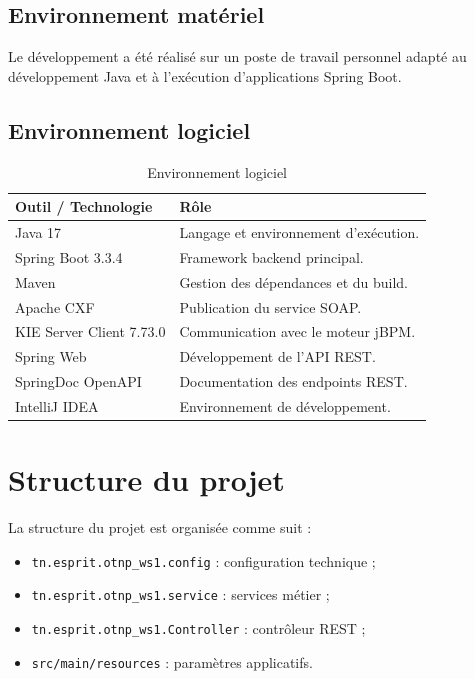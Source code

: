 \documentclass[12pt,a4paper]{report}
\begin{document}
\subsection{Environnement matériel}
Le développement a été réalisé sur un poste de travail personnel adapté au développement Java et à l'exécution d'applications Spring Boot.

\subsection{Environnement logiciel}
\begin{table}[h]
    \centering
    \begin{tabular}{p{4cm}p{9cm}}
        \toprule
        \textbf{Outil / Technologie} & \textbf{Rôle} \\
        \midrule
        Java 17 & Langage et environnement d'exécution. \\
        Spring Boot 3.3.4 & Framework backend principal. \\
        Maven & Gestion des dépendances et du build. \\
        Apache CXF & Publication du service SOAP. \\
        KIE Server Client 7.73.0 & Communication avec le moteur jBPM. \\
        Spring Web & Développement de l'API REST. \\
        SpringDoc OpenAPI & Documentation des endpoints REST. \\
        IntelliJ IDEA & Environnement de développement. \\
        \bottomrule
    \end{tabular}
    \caption{Environnement logiciel}
\end{table}

\section{Structure du projet}
La structure du projet est organisée comme suit :
\begin{itemize}
    \item \texttt{tn.esprit.otnp\_ws1.config} : configuration technique ;
    \item \texttt{tn.esprit.otnp\_ws1.service} : services métier ;
    \item \texttt{tn.esprit.otnp\_ws1.Controller} : contrôleur REST ;
    \item \texttt{src/main/resources} : paramètres applicatifs.
\end{itemize}
\end{document}
